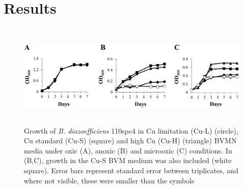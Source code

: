 \documentclass[12pt]{article}
\begin{document}
\section{Results}
\begin{figure}[h!]
\centering
\includegraphics[height=5cm]{Images/Figure1.jpg}
\caption{Growth of {\em B. diazoefficiens} 110spc4 in Cu limitation (Cu-L) (circle), Cu standard (Cu-S) (square) and
high Cu (Cu-H) (triangle) BVMN media under oxic (A), anoxic (B) and microoxic (C) conditions. In (B,C),
growth in the Cu-S BVM medium was also included (white square). Error bars represent standard error between
triplicates, and where not visible, these were smaller than the symbols}
\end{figure}
\end{document}
